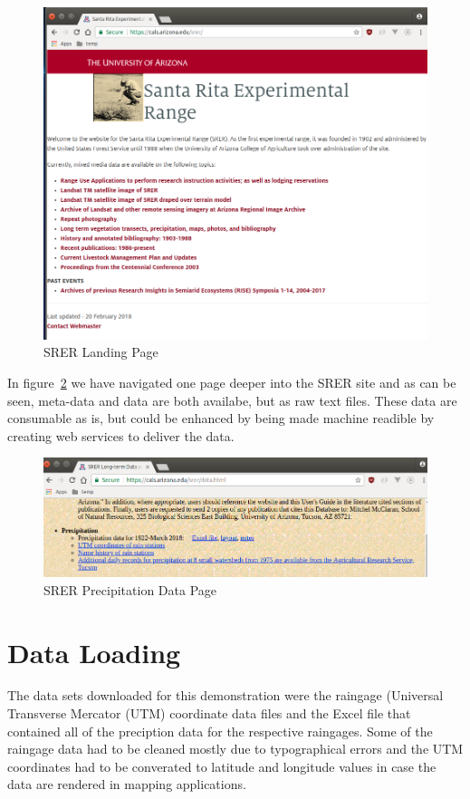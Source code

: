 \begin{figure}[htb]
  \centering\includegraphics[width=\columnwidth]{./images/srer_landing_page.png}
  \caption{SRER Landing Page \cite{hid505SrerWebSite2018}}\label{f:srer_landing_page}
\end{figure}


In figure~\ref{f:srer_precip_data_page} we have navigated one page deeper into the 
SRER site and as can be seen, meta-data and data are both availabe, but as raw 
text files.  These data are consumable as is, but could be enhanced by being 
made machine readible by creating web services to deliver the data.

\begin{figure}[htb]
  \centering\includegraphics[width=\columnwidth]{./images/srer_precip_data_page.png}
  \caption{SRER Precipitation Data Page \cite{hid505SrerWebSite2018}}\label{f:srer_precip_data_page}
\end{figure}

\section{Data Loading}
The data sets downloaded for this demonstration were the raingage (Universal 
Transverse Mercator (UTM) coordinate data files and the Excel file that 
contained all of the preciption data for the respective raingages.  Some of 
the raingage data had to be cleaned mostly due to typographical errors and the 
UTM coordinates had to be converated to latitude and longitude values in case 
the data are rendered in mapping applications.

